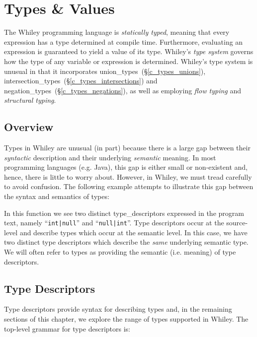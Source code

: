 \chapter{Types \& Values}
The Whiley programming language is {\em statically typed}, meaning that every expression has a type determined at compile time.  Furthermore, evaluating an expression is guaranteed to yield a value of its type.  Whiley's {\em type system} governs how the type of any variable or expression is determined.  Whiley's type system is unusual in that it incorporates \gls{union_type}s~(\S\ref{c_types_unions}), \gls{intersection_type}s~(\S\ref{c_types_intersections}) and \gls{negation_type}s~(\S\ref{c_types_negations}), as well as employing {\em flow typing} and {\em structural typing}.

\section{Overview}
\label{c_types_type_overview}

Types in Whiley are unusual (in part) because there is a large gap between their {\em syntactic} description and their underlying {\em semantic} meaning.  In most programming languages (e.g. Java), this gap is either small or non-existent and, hence, there is little to worry about.  However, in Whiley, we must tread carefully to avoid confusion.  The following example attempts to illustrate this gap between the syntax and semantics of types:



In this function we see two distinct \gls{type_descriptor}s expressed in the program text, namely ``\lstinline{int|null}'' and ``\lstinline{null|int}''.  Type descriptors occur at the source-level and describe \gls{type}s which occur at the semantic level.  In this case, we have two distinct type descriptors which describe the {\em same} underlying semantic type.  We will often refer to types as providing the semantic (i.e. meaning) of type descriptors.  

\pagebreak

\section{Type Descriptors}
\label{c_types_type_descriptors}
Type descriptors provide syntax for describing types and, in the remaining sections of this chapter, we explore the range of types supported in Whiley.  The top-level grammar for type descriptors is:


